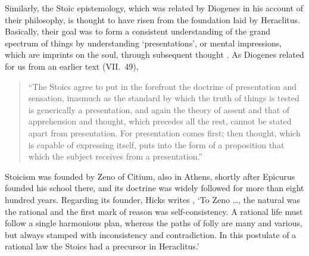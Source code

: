 Similarly, the Stoic epistemology, which was related by Diogenes in his account of their philosophy, is thought to have risen from the foundation laid by Heraclitus. Basically, their goal was to form a consistent understanding of the grand spectrum of things by understanding `presentations', or mental impressions, which are imprints on the soul, through subsequent thought \cite{Diogenes1931}. As Diogenes related for us from an earlier text \cite{Diogenes1931} (VII.~49),
\begin{quotation}
``The Stoics agree to put in the forefront the doctrine of presentation and sensation, inasmuch as the standard by which the truth of things is tested is generically a presentation, and again the theory of assent and that of apprehension and thought, which precedes all the rest, cannot be stated apart from presentation. For presentation comes first; then thought, which is capable of expressing itself, puts into the form of a proposition that which the subject receives from a presentation.''
\end{quotation} 
Stoicism was founded by Zeno of Citium, also in Athens, shortly after Epicurus founded his school there, and its doctrine was widely followed for more than eight hundred years. Regarding its founder, Hicks writes \cite{Hicks1962}, `To Zeno \ldots, the natural was the rational and the first mark of reason was self-consistency. A rational life must follow a single harmonious plan, whereas the paths of folly are many and various, but always stamped with inconsistency and contradiction. In this postulate of a rational law the Stoics had a precursor in Heraclitus.'
